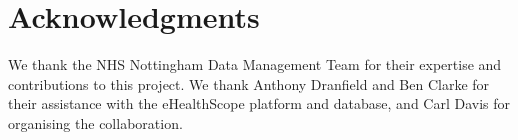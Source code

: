 \documentclass[11pt]{article}
\begin{document}






\section*{Acknowledgments}
We thank the NHS Nottingham Data Management Team for their expertise and contributions to this project. We thank Anthony Dranfield and Ben Clarke for their assistance with the eHealthScope platform and database, and Carl Davis for organising the collaboration.



\appendix

\end{document}
